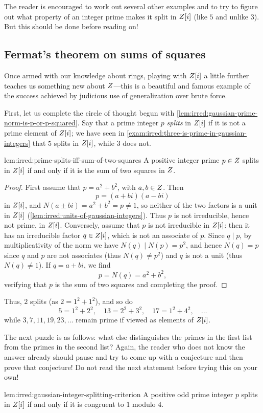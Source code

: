 The reader is encouraged to work out several other examples and to try
to figure out what property of an integer prime makes it split in
$Z[i]$ (like $5$ and unlike $3$). But this should be done before
reading on!

\subsection{Fermat's theorem on sums of squares}
\label{subsec:irred:fermat-s-theorem-on-sums-of-squares}
Once armed with our knowledge about rings, playing with $Z[i]$ a
little further teaches us something new about $Z$---this is a
beautiful and famous example of the success achieved by judicious use
of generalization over brute force.

First, let us complete the circle of thought begun with
\cref{lem:irred:gaussian-prime-norm-is-p-or-p-squared}.  Say that a prime integer $p$ \emph{splits} in
$Z[i]$ if it is not a prime element of $Z[i]$; we have seen in
\cref{exam:irred:three-is-prime-in-gaussian-integers} that $5$ splits in $Z[i]$, while $3$ does not.
\begin{lem}{}{lem:irred:prime-splits-iff-sum-of-two-squares}
  A positive integer prime $p \in Z$ splits in $Z[i]$ if and only if
  it is the sum of two squares in $Z$.
\end{lem}
\begin{proof}
  First assume that $p = a^2 + b^2$, with $a, b \in Z$. Then
  \[p = (a + bi)(a - bi)\] in $Z[i]$, and
  $N(a \pm bi) = a^2 + b^2 = p \neq 1$, so neither of the two factors
  is a unit in $Z[i]$ (\cref{lem:irred:units-of-gaussian-integers}).  Thus $p$ is not
  irreducible, hence not prime, in $Z[i]$.  Conversely, assume that
  $p$ is not irreducible in $Z[i]$: then it has an irreducible factor
  $q \in Z[i]$, which is not an associate of $p$. Since $q \mid p$,
  by multiplicativity of the norm we have $N(q) \mid N(p) = p^2$, and
  hence $N(q) = p$ since $q$ and $p$ are not associates (thus
  $N(q) \neq p^2$) and $q$ is not a unit (thus $N(q) \neq 1$). If
  $q = a + bi$, we find
  \[p = N(q) = a^2 + b^2,\] verifying that $p$ is the sum of two
  squares and completing the proof.
\end{proof}
Thus, $2$ splits (as $2 = 1^2 + 1^2$), and so do
\[5 = 1^2 + 2^2, \quad 13 = 2^2 + 3^2, \quad 17 = 1^2 + 4^2, \quad
  \dots\] while $3, 7, 11, 19, 23, \dots$ remain prime if viewed as
elements of $Z[i]$.

The next puzzle is as follows: what else distinguishes the primes in
the first list from the primes in the second list? Again, the reader
who does not know the answer already should pause and try to come up
with a conjecture and then prove that conjecture! Do not read the next
statement before trying this on your own!
\begin{lem}{}{lem:irred:gaussian-integer-splitting-criterion}
  A positive odd prime integer $p$ splits in $Z[i]$ if and only if it
  is congruent to $1$ modulo $4$.
\end{lem}

